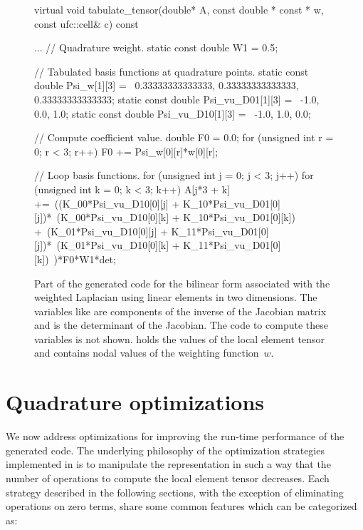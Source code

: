 \begin{figure}
\bwfig
\begin{c++}
virtual void tabulate_tensor(double* A,
                             const double * const * w,
                             const ufc::cell& c) const
{
  ...
  // Quadrature weight.
  static const double W1 = 0.5;

  // Tabulated basis functions at quadrature points.
  static const double Psi_w[1][3] = \
  {{0.33333333333333, 0.33333333333333, 0.33333333333333}};
  static const double Psi_vu_D01[1][3] = \
  {{-1.0, 0.0, 1.0}};
  static const double Psi_vu_D10[1][3] = \
  {{-1.0, 1.0, 0.0}};

  // Compute coefficient value.
  double F0 = 0.0;
  for (unsigned int r = 0; r < 3; r++)
    F0 += Psi_w[0][r]*w[0][r];

  // Loop basis functions.
  for (unsigned int j = 0; j < 3; j++)
  {
    for (unsigned int k = 0; k < 3; k++)
    {
      A[j*3 + k] +=\
      ((K_00*Psi_vu_D10[0][j] + K_10*Psi_vu_D01[0][j])*\
       (K_00*Psi_vu_D10[0][k] + K_10*Psi_vu_D01[0][k]) +\
       (K_01*Psi_vu_D10[0][j] + K_11*Psi_vu_D01[0][j])*\
       (K_01*Psi_vu_D10[0][k] + K_11*Psi_vu_D01[0][k])\
      )*F0*W1*det;
    }
  }
}
\end{c++}
\caption{Part of the generated code for the bilinear form associated
  with the weighted Laplacian using linear elements in two
  dimensions. The variables like \emp{K\_00} are components of the
  inverse of the Jacobian matrix and  is the determinant of the
  Jacobian. The code to compute these variables is not shown. 
  holds the values of the local element tensor and  contains
  nodal values of the weighting function~$w$.}
\label{oelgaard-2:fig:standard_code}
\end{figure}


\section{Quadrature optimizations}
\label{oelgaard-2:sec:quadrature_optimizations}
\index{quadrature optimizations}

We now address optimizations for improving the run-time performance of
the generated code.  The underlying philosophy of the optimization
strategies implemented in \ffc{} is to manipulate the representation
in such a way that the number of operations to compute the local
element tensor decreases.  Each strategy described in the following
sections, with the exception of eliminating operations on zero terms,
share some common features which can be categorized as:

